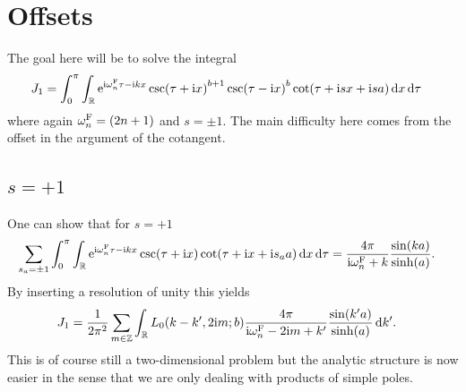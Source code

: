 \documentclass[english, parskip=full]{scrartcl}
\begin{document}
\section{Offsets}
The goal here will be to solve the integral
\begin{align}
J_1 &= \int_{0}^{\pi} \int_{\mathbb{R}} \text{e}^{\text{i} \omega_n^{\text{F}} \tau - \text{i} kx} \csc(\tau+\text{i} x)^{b+1} \csc(\tau-\text{i} x)^b \cot(\tau + \text{i} sx + \text{i} s a) \, \mathrm{d}x  \,\mathrm{d}\tau
\end{align}
where again $\omega_n^{\text{F}} = (2n+1)$ and $s=\pm 1$.
The main difficulty here comes from the offset in the argument of the cotangent.
\subsection{$s=+1$}
One can show that for $s=+1$
\begin{align}
\sum_{s_a=\pm 1} \int_{0}^{\pi} \int_{\mathbb{R}} \text{e}^{\text{i} \omega_n^{\text{F}} \tau - \text{i} kx} \csc(\tau+\text{i} x) \cot(\tau + \text{i} x + \text{i} s_aa) \, \mathrm{d}x  \,\mathrm{d}\tau &= \frac{4\pi}{\text{i}\omega_n^{\text{F}} + k} \frac{\sin(ka)}{\sinh(a)}.
\end{align}
By inserting a resolution of unity this yields
\begin{align}
J_1 &= \frac{1}{2\pi^2} \sum_{m\in\mathbb{Z}} \intr{L_0\kla*{k-k', 2\i m; b} \frac{4\pi}{\i\omega_n^\F - 2\i m + k'} \frac{\sin(k'a)}{\sinh(a)}}{k'}.
\end{align}
This is of course still a two-dimensional problem but the analytic structure is now easier in the sense that we are only dealing with products of simple poles.
\end{document}
